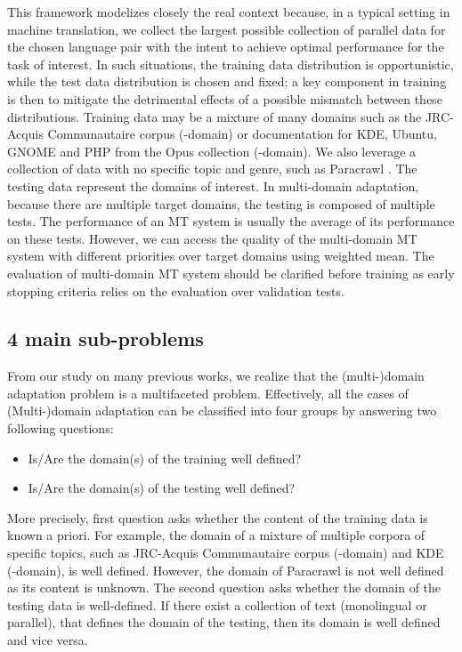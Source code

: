 This framework modelizes closely the real context because, in a typical setting in machine translation, we collect the largest possible collection of parallel data for the chosen language pair with the intent to achieve optimal performance for the task of interest. In such situations, the training data distribution is opportunistic, while the test data distribution is chosen and fixed; a key component in training is then to mitigate the detrimental effects of a possible mismatch between these distributions. Training data may be a mixture of many domains such as the JRC-Acquis Communautaire corpus (-domain) \citep{Steinberger06acquis} or documentation for KDE, Ubuntu, GNOME and PHP from the Opus collection \citep{Tiedemann09news} (-domain). We also leverage a collection of data with no specific topic and genre, such as Paracrawl \citep{Banon20Paracrawl}. The testing data represent the domains of interest. In multi-domain adaptation, because there are multiple target domains, the testing is composed of multiple tests. The performance of an MT system is usually the average of its performance on these tests. However, we can access the quality of the multi-domain MT system with different priorities over target domains using weighted mean. The evaluation of multi-domain MT system should be clarified before training as early stopping criteria relies on the evaluation over validation tests.
\subsection{4 main sub-problems}
From our study on many previous works, we realize that the (multi-)domain adaptation problem is a multifaceted problem. Effectively, all the cases of (Multi-)domain adaptation can be classified into four groups by answering two following questions:
\begin{itemize}
	\item Is/Are the domain(s) of the training well defined?
	\item Is/Are the domain(s) of the testing well defined?
\end{itemize}
More precisely, first question asks whether the content of the training data is known a priori. For example, the domain of a mixture of multiple corpora of specific topics, such as JRC-Acquis Communautaire corpus (-domain) and KDE (-domain), is well defined. However, the domain of Paracrawl \citep{Banon20Paracrawl} is not well defined as its content is unknown. The second question asks whether the domain of the testing data is well-defined. If there exist a collection of text (monolingual or parallel), that defines the domain of the testing, then its domain is well defined and vice versa. 

